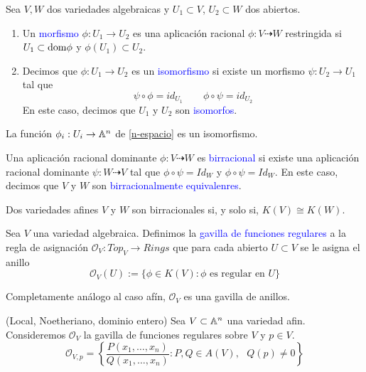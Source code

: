     \begin{definition}
        Sea $V,W$ dos variedades algebraicas y $U_1\subset V$, $U_2\subset W$ dos abiertos. 
        \begin{enumerate}
            \item Un \textcolor{blue}{morfismo} $\phi:U_1\to U_2$ es una aplicación racional $\phi:V\dashrightarrow W$ restringida si $U_1\subset\mathrm{dom}\phi$ y $\phi(U_1)\subset U_2$.
            \item Decimos que $\phi:U_1\to U_2$ es un \textcolor{blue}{isomorfismo} si existe un morfismo $\psi:U_2\to U_1$ tal que
            \begin{equation*}
                \psi\circ\phi=id_{U_1}\qquad \phi\circ\psi=id_{U_2}
            \end{equation*}
            En este caso, decimos que $U_1$ y $U_2$ son \textcolor{blue}{isomorfos}.
        \end{enumerate}
    \end{definition}

    \begin{propo}
        La función $\phi_i:U_i\to\mathbb{A}^n$ de \ref{n-espacio} es un isomorfismo.
    \end{propo}
    
    \begin{definition}
        Una aplicación racional dominante $\phi:V\dashrightarrow W$ es \textcolor{blue}{birracional} si existe una aplicación racional dominante $\psi:W\dashrightarrow V$ tal que $\phi\circ \psi=Id_W$ y $\phi\circ \psi=Id_W$. En este caso, decimos que $V$ y $W$ son \textcolor{blue}{birracionalmente equivalenres}.
    \end{definition}

    \begin{propo}
        Dos variedades afines $V$ y $W$ son birracionales si, y solo si, $K(V)\cong K(W)$.
    \end{propo}
    
    \begin{definition}
        Sea $V$ una variedad algebraica. Definimos la \textcolor{blue}{gavilla de funciones regulares} a la regla de asignación $\mathcal{O}_V:Top_V\to Rings$ que para cada abierto $U\subset V$ se le asigna el anillo
            \begin{equation*}
                \mathcal{O}_V(U):=\{\phi\in K(V): \phi\text{ es regular en }U\}
            \end{equation*}
    \end{definition}
    Completamente análogo al caso afín, $\mathcal{O}_V$ es una gavilla de anillos.
    
    \begin{example}(Local, Noetheriano, dominio entero)
        Sea $V\subset\mathbb{A}^n$ una variedad afin. Consideremos $\mathcal{O}_{V}$ la gavilla de funciones regulares sobre $V$ y $p\in V$. 
        $$\mathcal{O}_{V,p}=\left\{\frac{P(x_1,\dots,x_n)}{Q(x_1,\dots,x_n)}:P,Q\in A(V),\text{ }Q(p)\neq 0 \right\} $$
    \end{example}
